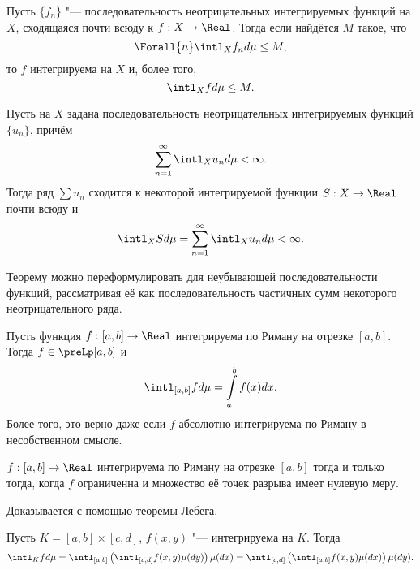\documentclass[main]{subfiles}
\begin{document}
\begin{theorem*}
  Пусть \( \{ f_n \} \) "--- последовательность
  неотрицательных интегрируемых функций на \( X \),
  сходящаяся почти всюду к \( f : X \to \Real \).
  Тогда если найдётся \( M \) такое, что
  \[
    \Forall{n} \intl_X f_n d \mu \le M,
  \]
  то \( f \) интегрируема на \( X \)
  и, более того,
  \[
    \intl_X f d \mu \le M.
  \]
\end{theorem*}

\begin{theorem*}
  Пусть на \( X \) задана последовательность
  неотрицательных интегрируемых функций \( \{ u_n \} \),
  причём
  \[
    \sum_{n=1}^\infty \intl_X u_n d \mu < \infty.
  \]
  Тогда ряд \( \sum u_n \) сходится к некоторой
  интегрируемой функции \( S : X \to \Real \)
  почти всюду и
  \[
    \intl_X S d \mu = \sum_{n=1}^\infty \intl_X u_n d \mu < \infty.
  \]
\end{theorem*}
\begin{remark}
  Теорему можно переформулировать
  для неубывающей последовательности функций,
  рассматривая её как последовательность
  частичных сумм некоторого неотрицательного ряда.
\end{remark}

\begin{theorem*}
  Пусть функция \( f : [a, b] \to \Real \)
  интегрируема по Риману на отрезке \( [a, b] \).
  Тогда \( f \in \preLp[a, b] \) и
  \[
    \intl_{[a,b]} f d \mu = \int\limits_a^b f(x) dx.
  \]
  Более того, это верно даже если
  \( f \) абсолютно интегрируема по Риману в несобственном смысле.
\end{theorem*}

\begin{theorem*}
  \( f : [a, b] \to \Real \) интегрируема по Риману
  на отрезке \( [a, b] \) тогда и только тогда, когда
  \( f \) ограниченна и множество её точек разрыва
  имеет нулевую меру.
\end{theorem*}

\begin{remark}
  Доказывается с помощью теоремы Лебега.
\end{remark}

\begin{theorem*}[Фубини]
  Пусть \( K = [a, b] \times [c, d] \),
  \( f(x, y) \) "--- интегрируема на \( K \).
  Тогда
  \[
    \intl_K f d \mu
    = \intl_{[a, b]} \left( \intl_{[c, d]} f(x, y) \mu(dy) \right) \mu(dx)
    = \intl_{[c, d]} \left( \intl_{[a, b]} f(x, y) \mu(dx) \right) \mu(dy).
  \]
\end{theorem*}
\end{document}
